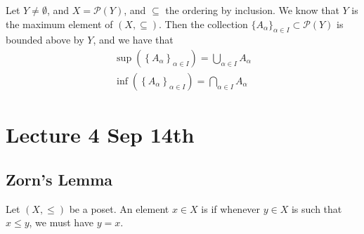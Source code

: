\documentclass[notoc,notitlepage]{tufte-book}
\begin{document}
\begin{eg}
  Let $Y \neq \emptyset$, and $X = \mathcal{P}(Y)$, and $\subseteq$ the ordering by inclusion. We know that $Y$ is the maximum element of $(X, \subseteq)$. Then the collection ${\{ A_\alpha \}}_{\alpha \in I} \subset \mathcal{P}(Y)$ is bounded above by $Y$, and we have that
  \begin{gather*}
    \sup \left( {\left\{ A_\alpha \right\}}_{\alpha \in I} \right) = \bigcup_{\alpha \in I} A_\alpha \\
    \inf \left( {\left\{ A_\alpha \right\}}_{\alpha \in I} \right) = \bigcap_{\alpha \in I} A_\alpha
  \end{gather*}
\end{eg}



\chapter{Lecture 4 Sep 14th}%
\label{chp:lecture_4_sep_14th}

\section{Zorn's Lemma}%
\label{sec:zorn_s_lemma}

\begin{defn}\label{defn:maximal_element}
  Let $(X, \leq)$ be a poset. An element $x \in X$ is  if whenever $y \in X$ is such that $x \leq y$, we must have $y = x$.
\end{defn}
\end{document}
